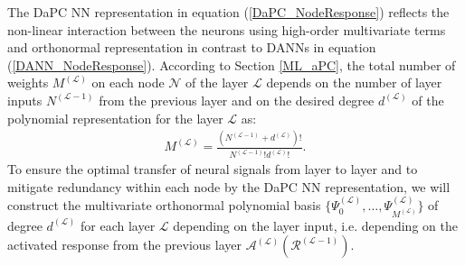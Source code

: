 \documentclass[a4paper,fleqn]{article}
\newcommand{\rw}[1]{\textcolor{blue}{#1}}
\renewcommand{\rw}[1]{#1}
\begin{document}
 The DaPC NN representation in equation (\ref{DaPC_NodeResponse}) reflects the non-linear interaction between the neurons using high-order \rw{multivariate} terms and orthonormal representation in contrast to DANNs in equation (\ref{DANN_NodeResponse}). According to Section \ref{ML_aPC}, the total number of weights $M^{(\mathcal{L})}$ on each node $\mathcal{N}$ of the layer $\mathcal{L}$ depends on the number of layer inputs $N^{(\mathcal{L}-1)}$ from the previous layer and on the desired degree $d^{(\mathcal{L})}$ of the polynomial representation for the layer $\mathcal{L}$ as:
\begin{eqnarray}
\label{DaPC_NofW}
M^{(\mathcal{L})} = \frac{(N^{(\mathcal{L}-1)}+d^{(\mathcal{L})})!}{N^{({\mathcal{L}-1})}!d^{(\mathcal{L})}!}.
\end{eqnarray}
%
To ensure the optimal transfer of neural signals from layer to layer and to mitigate redundancy \rw{within each node} by the DaPC NN representation, we will construct the multivariate orthonormal polynomial basis $\big\{ \Psi^{(\mathcal{L})}_0,\ldots, \Psi^{(\mathcal{L})}_{M^{(\mathcal{L})}}\big\}$ of degree $d^{(\mathcal{L})}$ for each layer $\mathcal{L}$ depending on the layer input, i.e. depending on the activated response from the previous layer $\mathcal{A}^{(\mathcal{L})} (\bm{\mathcal{R}}^{(\mathcal{L}-1)})$. 
\end{document}
